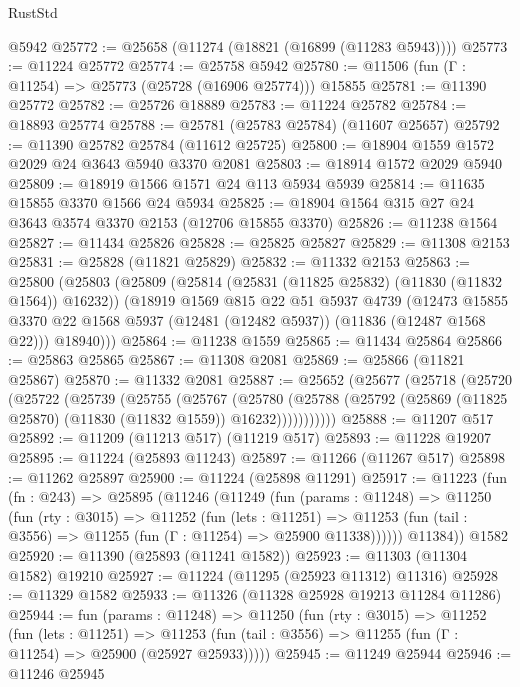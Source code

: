 \begin{lexlean}{RustStd}
\begin{coremodule}
    @5942
@25772 := @25658 (@11274 (@18821 (@16899 (@11283 @5943))))
@25773 := @11224 @25772
@25774 := @25758 @5942
@25780 := @11506 (fun (Γ : @11254) => @25773 (@25728 (@16906 @25774))) @15855
@25781 := @11390 @25772
@25782 := @25726 @18889
@25783 := @11224 @25782
@25784 := @18893 @25774
@25788 := @25781 (@25783 @25784) (@11607 @25657)
@25792 := @11390 @25782 @25784 (@11612 @25725)
@25800 := @18904 @1559 @1572 @2029 @24 @3643 @5940 @3370 @2081
@25803 := @18914 @1572 @2029 @5940
@25809 := @18919 @1566 @1571 @24 @113 @5934 @5939
@25814 := @11635 @15855 @3370 @1566 @24 @5934
@25825 := @18904 @1564 @315 @27 @24 @3643 @3574 @3370 @2153 (@12706 @15855 @3370)
@25826 := @11238 @1564
@25827 := @11434 @25826
@25828 := @25825 @25827
@25829 := @11308 @2153
@25831 := @25828 (@11821 @25829)
@25832 := @11332 @2153
@25863 := @25800
    (@25803
      (@25809
        (@25814 (@25831 (@11825 @25832) (@11830 (@11832 @1564)) @16232))
        (@18919
          @1569
          @815
          @22
          @51
          @5937
          @4739
          (@12473 @15855 @3370 @22 @1568 @5937 (@12481 (@12482 @5937)) (@11836 (@12487 @1568 @22)))
          @18940)))
@25864 := @11238 @1559
@25865 := @11434 @25864
@25866 := @25863 @25865
@25867 := @11308 @2081
@25869 := @25866 (@11821 @25867)
@25870 := @11332 @2081
@25887 := @25652
    (@25677
      (@25718
        (@25720
          (@25722
            (@25739
              (@25755
                (@25767
                  (@25780
                    (@25788
                      (@25792 (@25869 (@11825 @25870) (@11830 (@11832 @1559)) @16232)))))))))))
@25888 := @11207 @517
@25892 := @11209 (@11213 @517) (@11219 @517)
@25893 := @11228 @19207
@25895 := @11224 (@25893 @11243)
@25897 := @11266 (@11267 @517)
@25898 := @11262 @25897
@25900 := @11224 (@25898 @11291)
@25917 := @11223
    (fun (fn : @243) =>
    @25895
      (@11246
        (@11249
          (fun (params : @11248) =>
          @11250
            (fun (rty : @3015) =>
            @11252
              (fun (lets : @11251) =>
              @11253 (fun (tail : @3556) => @11255 (fun (Γ : @11254) => @25900 @11338))))))
        @11384))
    @1582
@25920 := @11390 (@25893 (@11241 @1582))
@25923 := @11303 (@11304 @1582) @19210
@25927 := @11224 (@11295 (@25923 @11312) @11316)
@25928 := @11329 @1582
@25933 := @11326 (@11328 @25928 @19213 @11284 @11286)
@25944 := fun (params : @11248) =>
  @11250
    (fun (rty : @3015) =>
    @11252
      (fun (lets : @11251) =>
      @11253 (fun (tail : @3556) => @11255 (fun (Γ : @11254) => @25900 (@25927 @25933)))))
@25945 := @11249 @25944
@25946 := @11246 @25945

\end{coremodule}
\end{lexlean}
